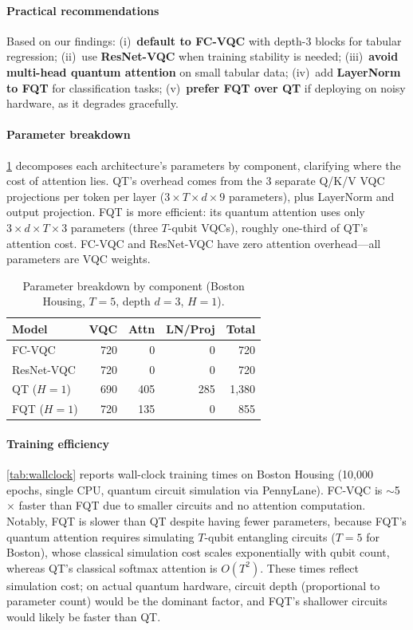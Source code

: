 \documentclass[10pt,conference]{IEEEtran}
\begin{document}
\paragraph{Practical recommendations}
Based on our findings: (i)~\textbf{default to FC-VQC} with depth-3 blocks for tabular regression; (ii)~use \textbf{ResNet-VQC} when training stability is needed; (iii)~\textbf{avoid multi-head quantum attention} on small tabular data; (iv)~add \textbf{LayerNorm to FQT} for classification tasks; (v)~\textbf{prefer FQT over QT} if deploying on noisy hardware, as it degrades gracefully.

\paragraph{Parameter breakdown}
\cref{tab:param-breakdown} decomposes each architecture's parameters by component, clarifying where the cost of attention lies.
QT's overhead comes from the 3 separate Q/K/V VQC projections per token per layer ($3 \times T \times d \times 9$ parameters), plus LayerNorm and output projection.
FQT is more efficient: its quantum attention uses only $3 \times d \times T \times 3$ parameters (three $T$-qubit VQCs), roughly one-third of QT's attention cost.
FC-VQC and ResNet-VQC have zero attention overhead---all parameters are VQC weights.

\begin{table}[t]
\centering
\caption{Parameter breakdown by component (Boston Housing, $T{=}5$, depth $d{=}3$, $H{=}1$).}
\label{tab:param-breakdown}
\small
\begin{tabular}{lrrrr}
\toprule
Model & VQC & Attn & LN/Proj & Total \\
\midrule
FC-VQC & 720 & 0 & 0 & 720 \\
ResNet-VQC & 720 & 0 & 0 & 720 \\
QT ($H{=}1$) & 690 & 405 & 285 & 1{,}380 \\
FQT ($H{=}1$) & 720 & 135 & 0 & 855 \\
\bottomrule
\end{tabular}
\vspace{-10pt}
\end{table}

\paragraph{Training efficiency}
\cref{tab:wallclock} reports wall-clock training times on Boston Housing (10{,}000 epochs, single CPU, quantum circuit simulation via PennyLane).
FC-VQC is ${\sim}$5${\times}$ faster than FQT due to smaller circuits and no attention computation.
Notably, FQT is slower than QT despite having fewer parameters, because FQT's quantum attention requires simulating $T$-qubit entangling circuits ($T{=}5$ for Boston), whose classical simulation cost scales exponentially with qubit count, whereas QT's classical softmax attention is $O(T^2)$.
These times reflect simulation cost; on actual quantum hardware, circuit depth (proportional to parameter count) would be the dominant factor, and FQT's shallower circuits would likely be faster than QT.
\end{document}
